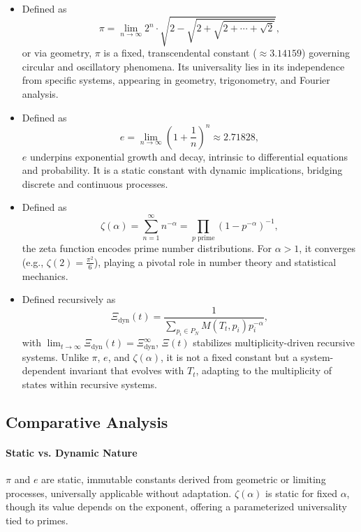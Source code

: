 \documentclass{article}
\theoremstyle{plain}
\begin{document}
\begin{itemize}
\begin{itemize}
    \item[\textbf{\(\pi\)}] Defined as 
    \[
    \pi = \lim_{n \to \infty} 2^n \cdot \sqrt{2 - \sqrt{2 + \sqrt{2 + \cdots + \sqrt{2}}}},
    \]
    or via geometry, \(\pi\) is a fixed, transcendental constant (\(\approx 3.14159\)) governing circular and oscillatory phenomena. Its universality lies in its independence from specific systems, appearing in geometry, trigonometry, and Fourier analysis.

    \item[\textbf{\(e\)}] Defined as 
    \[
    e = \lim_{n \to \infty} \left(1 + \frac{1}{n}\right)^n \approx 2.71828,
    \]
    \(e\) underpins exponential growth and decay, intrinsic to differential equations and probability. It is a static constant with dynamic implications, bridging discrete and continuous processes.

    \item[\textbf{\(\zeta(\alpha)\)}] Defined as 
    \[
    \zeta(\alpha) = \sum_{n=1}^\infty n^{-\alpha} = \prod_{p \text{ prime}} (1 - p^{-\alpha})^{-1},
    \]
    the zeta function encodes prime number distributions. For \(\alpha > 1\), it converges (e.g., \(\zeta(2) = \frac{\pi^2}{6}\)), playing a pivotal role in number theory and statistical mechanics.

    \item[\textbf{\(\Xi_{\text{dyn}}(t)\)}] Defined recursively as 
    \[
    \Xi_{\text{dyn}}(t) = \frac{1}{\sum_{p_i \in P_N} M(T_t, p_i) p_i^{-\alpha}},
    \]
    with \(\lim_{t \to \infty} \Xi_{\text{dyn}}(t) = \Xi_{\text{dyn}}^\infty\), \(\Xi(t) \) stabilizes multiplicity-driven recursive systems. Unlike \( \pi \), \( e \), and \( \zeta(\alpha) \), it is not a fixed constant but a system-dependent invariant that evolves with \(T_t\), adapting to the multiplicity of states within recursive systems.
\end{itemize}

\subsection{Comparative Analysis}

\paragraph{Static vs. Dynamic Nature}
\(\pi\) and \(e\) are static, immutable constants derived from geometric or limiting processes, universally applicable without adaptation. \(\zeta(\alpha)\) is static for fixed \(\alpha\), though its value depends on the exponent, offering a parameterized universality tied to primes.


\end{itemize}
\end{document}

